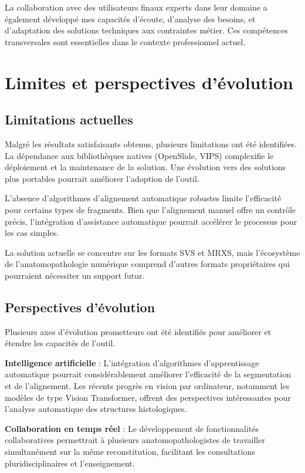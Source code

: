 \documentclass[12pt,a4paper]{report}
\begin{document}
La collaboration avec des utilisateurs finaux experts dans leur domaine a également développé mes capacités d'écoute, d'analyse des besoins, et d'adaptation des solutions techniques aux contraintes métier. Ces compétences transversales sont essentielles dans le contexte professionnel actuel.

\section{Limites et perspectives d'évolution}

\subsection{Limitations actuelles}

Malgré les résultats satisfaisants obtenus, plusieurs limitations ont été identifiées. La dépendance aux bibliothèques natives (OpenSlide, VIPS) complexifie le déploiement et la maintenance de la solution. Une évolution vers des solutions plus portables pourrait améliorer l'adoption de l'outil.

L'absence d'algorithmes d'alignement automatique robustes limite l'efficacité pour certains types de fragments. Bien que l'alignement manuel offre un contrôle précis, l'intégration d'assistance automatique pourrait accélérer le processus pour les cas simples.

La solution actuelle se concentre sur les formats SVS et MRXS, mais l'écosystème de l'anatomopathologie numérique comprend d'autres formats propriétaires qui pourraient nécessiter un support futur.

\subsection{Perspectives d'évolution}

Plusieurs axes d'évolution prometteurs ont été identifiés pour améliorer et étendre les capacités de l'outil.

\textbf{Intelligence artificielle} : L'intégration d'algorithmes d'apprentissage automatique pourrait considérablement améliorer l'efficacité de la segmentation et de l'alignement. Les récents progrès en vision par ordinateur, notamment les modèles de type Vision Transformer, offrent des perspectives intéressantes pour l'analyse automatique des structures histologiques.

\textbf{Collaboration en temps réel} : Le développement de fonctionnalités collaboratives permettrait à plusieurs anatomopathologistes de travailler simultanément sur la même reconstitution, facilitant les consultations pluridisciplinaires et l'enseignement.
\end{document}
